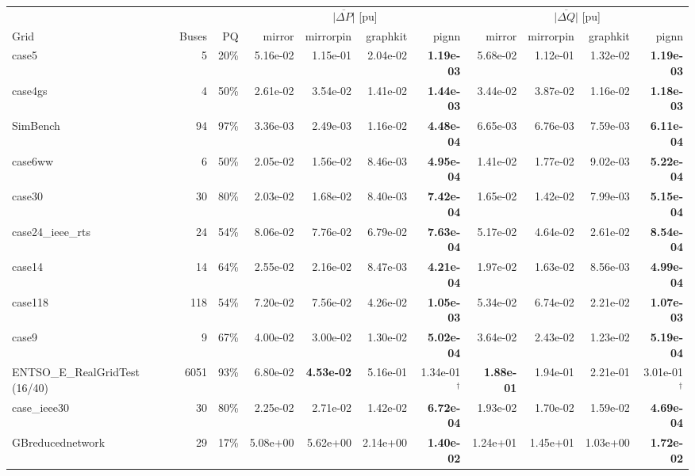 \documentclass[10pt]{article}
\begin{document}
\begin{landscape}
\begin{table}[H]
\centering\scriptsize
\begin{tabular}{lrr rrrr rrrr}
\toprule
 & & & \multicolumn{4}{c}{$\overline{|\Delta P|}$ [pu]} & \multicolumn{4}{c}{$\overline{|\Delta Q|}$ [pu]} \\
\cmidrule(lr){4-7}\cmidrule(lr){8-11}
Grid & Buses & PQ & mirror & mirrorpin & graphkit & pignn & mirror & mirrorpin & graphkit & pignn \\
\midrule
case5 & 5 & 20\% & 5.16e-02 & 1.15e-01 & 2.04e-02 & \textbf{1.19e-03} & 5.68e-02 & 1.12e-01 & 1.32e-02 & \textbf{1.19e-03} \\
case4gs & 4 & 50\% & 2.61e-02 & 3.54e-02 & 1.41e-02 & \textbf{1.44e-03} & 3.44e-02 & 3.87e-02 & 1.16e-02 & \textbf{1.18e-03} \\
SimBench & 94 & 97\% & 3.36e-03 & 2.49e-03 & 1.16e-02 & \textbf{4.48e-04} & 6.65e-03 & 6.76e-03 & 7.59e-03 & \textbf{6.11e-04} \\
case6ww & 6 & 50\% & 2.05e-02 & 1.56e-02 & 8.46e-03 & \textbf{4.95e-04} & 1.41e-02 & 1.77e-02 & 9.02e-03 & \textbf{5.22e-04} \\
case30 & 30 & 80\% & 2.03e-02 & 1.68e-02 & 8.40e-03 & \textbf{7.42e-04} & 1.65e-02 & 1.42e-02 & 7.99e-03 & \textbf{5.15e-04} \\
case24\_ieee\_rts & 24 & 54\% & 8.06e-02 & 7.76e-02 & 6.79e-02 & \textbf{7.63e-04} & 5.17e-02 & 4.64e-02 & 2.61e-02 & \textbf{8.54e-04} \\
case14 & 14 & 64\% & 2.55e-02 & 2.16e-02 & 8.47e-03 & \textbf{4.21e-04} & 1.97e-02 & 1.63e-02 & 8.56e-03 & \textbf{4.99e-04} \\
case118 & 118 & 54\% & 7.20e-02 & 7.56e-02 & 4.26e-02 & \textbf{1.05e-03} & 5.34e-02 & 6.74e-02 & 2.21e-02 & \textbf{1.07e-03} \\
case9 & 9 & 67\% & 4.00e-02 & 3.00e-02 & 1.30e-02 & \textbf{5.02e-04} & 3.64e-02 & 2.43e-02 & 1.23e-02 & \textbf{5.19e-04} \\
ENTSO\_E\_RealGridTest\,(16/40) & 6051 & 93\% & 6.80e-02 & \textbf{4.53e-02} & 5.16e-01 & 1.34e-01$^\dagger$ & \textbf{1.88e-01} & 1.94e-01 & 2.21e-01 & 3.01e-01$^\dagger$ \\
case\_ieee30 & 30 & 80\% & 2.25e-02 & 2.71e-02 & 1.42e-02 & \textbf{6.72e-04} & 1.93e-02 & 1.70e-02 & 1.59e-02 & \textbf{4.69e-04} \\
GBreducednetwork & 29 & 17\% & 5.08e+00 & 5.62e+00 & 2.14e+00 & \textbf{1.40e-02} & 1.24e+01 & 1.45e+01 & 1.03e+00 & \textbf{1.72e-02} \\

\end{tabular}
\end{table}
\end{landscape}
\end{document}
